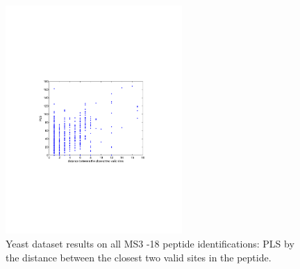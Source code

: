 \begin{figure}[htbp]
\centering %
\includegraphics[trim = 0mm 90mm 20mm 90mm,clip,width=0.6\textwidth]{fig/phospho/allIds/PLS_figs/allIds_PLS_by_valid_site_distance.pdf}
\caption{Yeast dataset results on all MS3 -18 peptide identifications: PLS by the distance between the closest two valid sites in the peptide.}
\label{fig:yeast_pls}
\end{figure}

